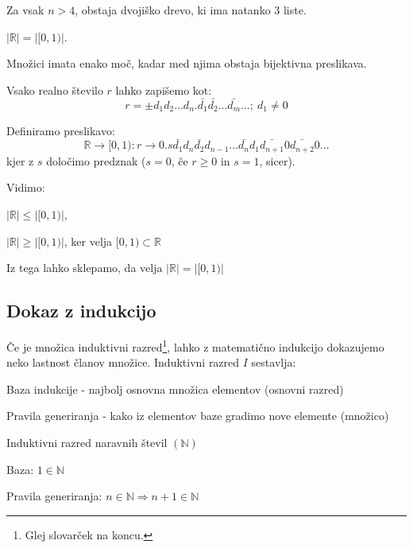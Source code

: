 \documentclass[10pt,a4paper,oneside]{book}
\begin{document}
\begin{primeri}
\item Za vsak $n>4$, obstaja dvojiško drevo, ki ima natanko $3$ liste.
\item $| \mathbb{R} | = | [0,1) |$.\\
	\begin{items}
	\item Množici imata enako moč, kadar med njima obstaja bijektivna preslikava.
	\item Vsako realno število $r$ lahko zapišemo kot:
	\begin{displaymath}
		r=\pm d_1 d_2 \dots d_n . \bar{d_1}\bar{d_2} \dots \bar{d_m} \dots ;\ d_1 \neq 0
	\end{displaymath}
	\item Definiramo preslikavo:
	\begin{displaymath}
		\mathbb{R}\rightarrow [0,1): r\rightarrow 0.s\bar{d_{1}}d_{n}\bar{d_{2}}d_{n-1}...\bar{d_{n}}d_{1}\bar{d_{n+1}}0\bar{d_{n+2}}0...
	\end{displaymath}
	kjer z $s$ določimo predznak ($s=0$, če $r \ge 0$ in $s=1$, sicer).
	\item Vidimo:
		\begin{items}
		\item $|\mathbb{R}|\le |[0,1)|$, %
		\item $|\mathbb{R}|\ge |[0,1)|$, ker velja $[0,1) \subset \mathbb{R}$
		\end{items}
	\item Iz tega lahko sklepamo, da velja $|\mathbb{R}|=|[0,1)|$
	\end{items}
\end{primeri}
	
\subsection{Dokaz z indukcijo}
Če je množica induktivni razred\footnote{Glej slovarček na koncu.}, lahko z matematično indukcijo dokazujemo neko lastnost članov množice.
\br
Induktivni razred $I$ sestavlja:
\begin{items}
\item Baza indukcije - najbolj osnovna množica elementov (osnovni razred)
\item Pravila generiranja - kako iz elementov baze gradimo nove elemente (množico)
\end{items}
\begin{primeri}
\item Induktivni razred naravnih števil $(\mathbb{N})$
	\begin{items}
	\item Baza: $1 \in \mathbb{N}$ 
	\item Pravila generiranja: $n \in \mathbb{N} \Longrightarrow n+1 \in \mathbb{N} $
	\end{items}
\item {}
\end{primeri}
\end{document}
